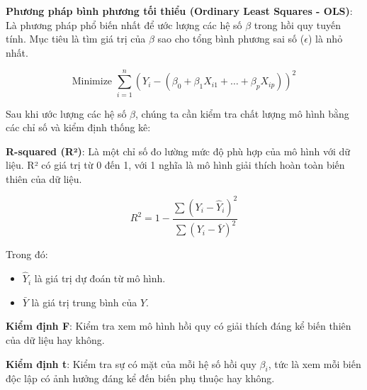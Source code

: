 \textbf{Phương pháp bình phương tối thiểu (Ordinary Least Squares - OLS)}: Là phương pháp phổ biến nhất để ước lượng các hệ số \(\beta\) trong hồi quy tuyến tính. Mục tiêu là tìm giá trị của \(\beta\) sao cho tổng bình phương sai số (\(\epsilon\)) là nhỏ nhất.
  
\[
\text{Minimize } \sum_{i=1}^{n} (Y_i - (\beta_0 + \beta_1 X_{i1} + \dots + \beta_p X_{ip}))^2
\]

Sau khi ước lượng các hệ số \(\beta\), chúng ta cần kiểm tra chất lượng mô hình bằng các chỉ số và kiểm định thống kê:

\textbf{R-squared (R²)}: Là một chỉ số đo lường mức độ phù hợp của mô hình với dữ liệu. R² có giá trị từ 0 đến 1, với 1 nghĩa là mô hình giải thích hoàn toàn biến thiên của dữ liệu.
  
  \[
  R^2 = 1 - \frac{\sum (Y_i - \hat{Y}_i)^2}{\sum (Y_i - \bar{Y})^2}
  \]
  
  Trong đó:
  \begin{itemize}
    \item \(\hat{Y}_i\) là giá trị dự đoán từ mô hình.
    \item \(\bar{Y}\) là giá trị trung bình của \(Y\).
  \end{itemize}

\textbf{Kiểm định F}: Kiểm tra xem mô hình hồi quy có giải thích đáng kể biến thiên của dữ liệu hay không.

\textbf{Kiểm định t}: Kiểm tra sự có mặt của mỗi hệ số hồi quy \(\beta_i\), tức là xem mỗi biến độc lập có ảnh hưởng đáng kể đến biến phụ thuộc hay không.
